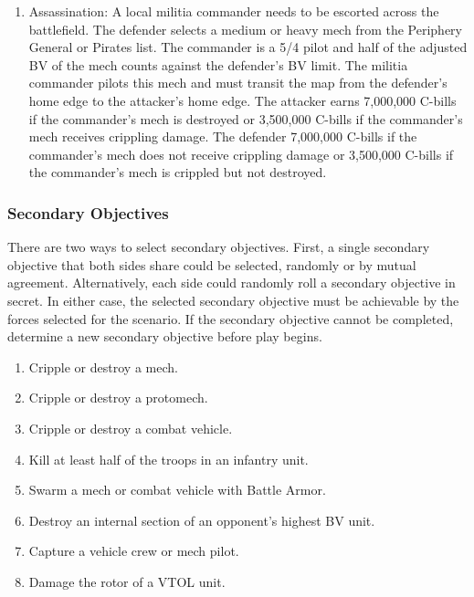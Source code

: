 \documentclass{article}
\begin{document}
\begin{enumerate}
\item Assassination: A local militia commander needs to be escorted across the battlefield.
The defender selects a medium or heavy mech from the Periphery General or Pirates list.
The commander is a 5/4 pilot and half of the adjusted BV of the mech counts against the defender's BV limit.
The militia commander pilots this mech and must transit the map from the defender's home edge to the attacker's home edge.
The attacker earns 7,000,000 C-bills if the commander's mech is destroyed or 3,500,000 C-bills if the commander's mech receives crippling damage.
The defender 7,000,000 C-bills if the commander's mech does not receive crippling damage  or 3,500,000 C-bills if the commander's mech is crippled but not destroyed.

\end{enumerate}

\subsubsection{Secondary Objectives}

There are two ways to select secondary objectives.
First, a single secondary objective that both sides share could be selected, randomly or by mutual agreement.
Alternatively, each side could randomly roll a secondary objective in secret.
In either case, the selected secondary objective must be achievable by the forces selected for the scenario.
If the secondary objective cannot be completed, determine a new secondary objective before play begins.

\begin{enumerate}

\item Cripple or destroy a mech.

\item Cripple or destroy a protomech.

\item Cripple or destroy a combat vehicle.

\item Kill at least half of the troops in an infantry unit.

\item Swarm a mech or combat vehicle with Battle Armor.

\item Destroy an internal section of an opponent's highest BV unit.

\item Capture a vehicle crew or mech pilot.

\item Damage the rotor of a VTOL unit.

\end{enumerate}
\end{document}
